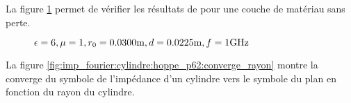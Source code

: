         La figure \ref{fig:imp_fourier:cylindre:hoppe_p62} permet de vérifier les résultats de \cite[p.~62]{hoppe_impedance_1995} pour une couche de matériau sans perte.


        \begin{figure}[!hbt]
            \centering
            \caption{$\epsilon = 6, \mu = 1, r_0 = 0.0300\text{m}, d=0.0225\text{m}, f=1\text{GHz}$}
            \label{fig:imp_fourier:cylindre:hoppe_p62}
        \end{figure}
        
        La figure \ref{fig:imp_fourier:cylindre:hoppe_p62:converge_rayon} montre la converge du symbole de l'impédance d'un cylindre vers le symbole du plan en fonction du rayon du cylindre.


